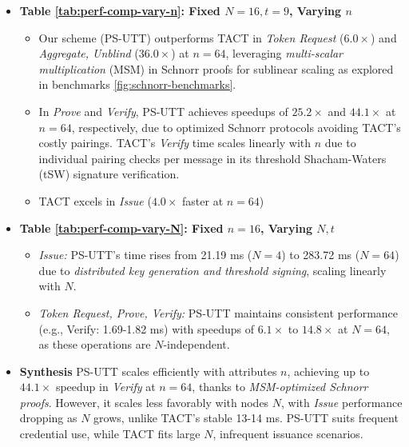 \begin{itemize}
    \item \textbf{Table \ref{tab:perf-comp-vary-n}: Fixed $N = 16, t = 9$, Varying $n$}
        \begin{itemize}
        \item Our scheme (PS-UTT) outperforms TACT in \textit{Token Request} ($6.0\times$) and \textit{Aggregate, Unblind} ($36.0\times$) at $n = 64$, leveraging \textit{multi-scalar multiplication} (MSM) in Schnorr proofs for sublinear scaling as explored in benchmarks \ref{fig:schnorr-benchmarks}. 
        
        \item In \textit{Prove} and \textit{Verify}, PS-UTT achieves speedups of $25.2\times$ and $44.1\times$ at $n = 64$, respectively, due to optimized Schnorr protocols avoiding TACT's costly pairings. TACT's \textit{Verify} time scales linearly with $n$ due to individual pairing checks per message in its threshold Shacham-Waters (tSW) signature verification.
        
        \item TACT excels in \textit{Issue} ($4.0\times$ faster at $n = 64$)
    \end{itemize}

    \item  \textbf{Table \ref{tab:perf-comp-vary-N}: Fixed $n = 16$, Varying $N,t$}
        \begin{itemize}
            \item \textit{Issue:} PS-UTT's time rises from 21.19 ms ($N = 4$) to 283.72 ms ($N = 64$) due to \textit{distributed key generation and threshold signing}, scaling linearly with $N$. 
            \item \textit{Token Request, Prove, Verify:} PS-UTT maintains consistent performance (e.g., Verify: 1.69-1.82 ms) with speedups of $6.1\times$ to $14.8\times$ at $N = 64$, as these operations are $N$-independent.
        \end{itemize}

    \item \textbf{Synthesis}
    PS-UTT scales efficiently with attributes $n$, achieving up to $44.1\times$ speedup in \textit{Verify} at $n = 64$, thanks to \textit{MSM-optimized Schnorr proofs}. However, it scales less favorably with nodes $N$, with \textit{Issue} performance dropping as $N$ grows, unlike TACT’s stable 13-14 ms. PS-UTT suits frequent credential use, while TACT fits large $N$, infrequent issuance scenarios.

\end{itemize}



